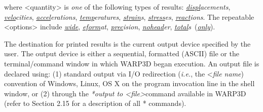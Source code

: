 \documentclass[11pt]{report}
\numberwithin{equation}{section}
\newcommand{\nin} {\noindent}
\newcommand{\ul} {\underline}
\newcommand{\ti}{\emph}
\newcommand{\tl}{\textless\xspace}
\newcommand{\tg}{\textgreater\xspace}
\newcommand{\ie}{\emph{i.e.},\xspace}
\begin{document}
\nin
where \tl{quantity}\tg is \ti{one} of the following types of results: 
\ti{\ul{displ}acements},
\ti{\ul{velo}cities}, 
\ti{\ul{accel}erations}, \ti{\ul{temp}eratures}, \ti{\ul{strain}s}, 
\ti{\ul{stress}es}, \ti{\ul{react}ions}. The repeatable  \tl{options}\tg include
\ti{\ul{wide}}, \ti{\ul{eform}at}, \ti{\ul{prec}ision}, \ti{\ul{nohead}er}, 
\ti{\ul{total}s}\ (\ul{\ti{only}}).

The destination for printed results is the current output device specified by the
user. The output device is either a sequential, formatted (ASCII) file or 
the terminal/command window in which WARP3D began execution. An
output file is declared using: (1) standard output via I/O redirection
(\ie the \tl \ti{file name})
convention of Windows, Linux, OS X on the program invocation line 
in the shell window, or (2) through the \ti{*output to \tl{file}\tg}command available in 
WARP3D (refer to Section 2.15 for a description of all *
commands). 
\end{document}
